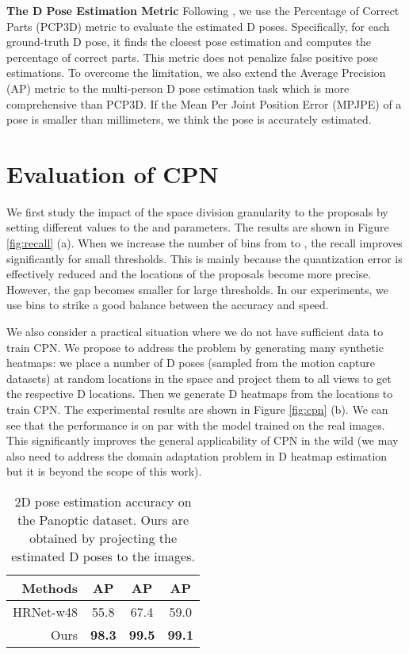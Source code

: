 \documentclass[runningheads]{llncs}
\begin{document}
\noindent
\textbf{The D Pose Estimation Metric} Following \cite{dong2019fast}, we use the Percentage of Correct Parts (PCP3D) metric to evaluate the estimated D poses. Specifically, for each ground-truth D pose, it finds the closest pose estimation and computes the percentage of correct parts. This metric does not penalize false positive pose estimations. To overcome the limitation, we also extend the Average Precision (AP) metric \cite{pishchulin2016deepcut} to the multi-person D pose estimation task which is more comprehensive than PCP3D. If the Mean
Per Joint Position Error (MPJPE) of a pose is smaller than  millimeters, we think the pose is accurately estimated. 




\section{Evaluation of CPN}
We first study the impact of the space division granularity to the proposals by setting different values to the  and  parameters. The results are shown in Figure \ref{fig:recall} (a). When we increase the number of bins from  to , the recall improves significantly for small thresholds. This is mainly because the quantization error is effectively reduced and the locations of the proposals become more precise.  However, the gap becomes smaller for large thresholds. In our experiments, we use  bins to strike a good balance between the accuracy and speed.




We also consider a practical situation where we do not have sufficient data to train CPN. We propose to address the problem by generating many synthetic heatmaps: we place a number of D poses (sampled from the motion capture datasets) at random locations in the space and project them to all views to get the respective D locations. Then we generate D heatmaps from the locations to train CPN. The experimental results are shown in Figure \ref{fig:cpn} (b). We can see that the performance is on par with the model trained on the real images. This significantly improves the general applicability of CPN in the wild (we may also need to address the domain adaptation problem in D heatmap estimation but it is beyond the scope of this work).

\begin{table*}[]
\setlength{\tabcolsep}{15pt}
    \centering
    \begin{tabular}{r||ccc}
        \toprule
         Methods &  AP & AP & AP \\
         \midrule
         HRNet-w48\cite{sun2019deep} & 55.8 & 67.4 & 59.0 \\
         Ours & \textbf{98.3} & \textbf{99.5} & \textbf{99.1} \\
         \bottomrule
    \end{tabular}
    \caption{2D pose estimation accuracy on the Panoptic dataset. Ours are obtained by projecting the estimated D poses to the images.}
    \label{tab:panoptic_2d}
\end{table*}
\end{document}
